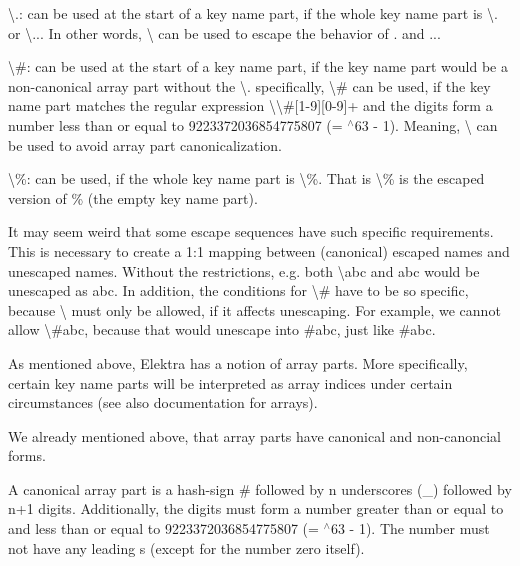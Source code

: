 \begin{DoxyItemize}
\item {\ttfamily \textbackslash{}.}\+: can be used at the start of a key name part, if the whole key name part is {\ttfamily \textbackslash{}.} or {\ttfamily \textbackslash{}..}. In other words, {\ttfamily \textbackslash{}} can be used to escape the behavior of {\ttfamily .} and {\ttfamily ..}.
\item {\ttfamily \textbackslash{}\#}\+: can be used at the start of a key name part, if the key name part would be a non-\/canonical array part without the {\ttfamily \textbackslash{}}. specifically, {\ttfamily \textbackslash{}\#} can be used, if the key name part matches the regular expression {\ttfamily \textbackslash{}\textbackslash{}\#\mbox{[}1-\/9\mbox{]}\mbox{[}0-\/9\mbox{]}+} and the digits form a number less than or equal to 9223372036854775807 (= {$^\wedge$63 -\/ 1}). Meaning, {\ttfamily \textbackslash{}} can be used to avoid array part canonicalization.
\item {\ttfamily \textbackslash{}\%}\+: can be used, if the whole key name part is {\ttfamily \textbackslash{}\%}. That is {\ttfamily \textbackslash{}\%} is the escaped version of {\ttfamily \%} (the empty key name part).
\end{DoxyItemize}

It may seem weird that some escape sequences have such specific requirements. This is necessary to create a 1\+:1 mapping between (canonical) escaped names and unescaped names. Without the restrictions, e.\+g. both {\ttfamily \textbackslash{}abc} and {\ttfamily abc} would be unescaped as {\ttfamily abc}. In addition, the conditions for {\ttfamily \textbackslash{}\#} have to be so specific, because {\ttfamily \textbackslash{}} must only be allowed, if it affects unescaping. For example, we cannot allow {\ttfamily \textbackslash{}\#abc}, because that would unescape into {\ttfamily \#abc}, just like {\ttfamily \#abc}.

As mentioned above, Elektra has a notion of array parts. More specifically, certain key name parts will be interpreted as array indices under certain circumstances (see also documentation for arrays).

We already mentioned above, that array parts have canonical and non-\/canoncial forms.

A canonical array part is a hash-\/sign {\ttfamily \#} followed by {\ttfamily n} underscores ({\ttfamily \+\_\+}) followed by {\ttfamily n+1} digits. Additionally, the digits must form a number greater than or equal to {} and less than or equal to 9223372036854775807 (= {$^\wedge$63 -\/ 1}). The number must not have any leading {}s (except for the number zero itself).

